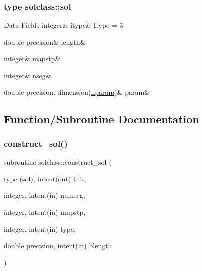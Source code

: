 \subsubsection{type solclass\+::sol}
\begin{DoxyFields}{Data Fields}
\mbox{\label{namespacesolclass_ae34e01b972a2658f3ff55fccc3f6b99a}} 
integer&
itype&
Itype = 3. \\
\hline

\mbox{\label{namespacesolclass_a66fe4253293f305d51d6d7db753bb2c2}} 
double precision&
length&
\\
\hline

\mbox{\label{namespacesolclass_a3821a5713cb3e0e9ae5359b42644b860}} 
integer&
mapstp&
\\
\hline

\mbox{\label{namespacesolclass_a4e0b71eae9d2072fd83b1a4e524da7fc}} 
integer&
nseg&
\\
\hline

\mbox{\label{namespacesolclass_a70efaac352dbf744000a92effd3d814b}} 
double precision, dimension(\mbox{\hyperlink{namespacesolclass_abb5af39a08a5ff2cbe713621b2727eaf}{nparam}})&
param&
\\
\hline

\end{DoxyFields}


\subsection{Function/\+Subroutine Documentation}
\mbox{\label{namespacesolclass_a2307b36cefac8604240e62757dd08cb9}} 
\subsubsection{\texorpdfstring{construct\_sol()}{construct\_sol()}}
{\footnotesize\ttfamily subroutine solclass\+::construct\+\_\+sol (\begin{DoxyParamCaption}\item[{type (\mbox{\hyperlink{namespacesolclass_structsolclass_1_1sol}{sol}}), intent(out)}]{this,  }\item[{integer, intent(in)}]{numseg,  }\item[{integer, intent(in)}]{nmpstp,  }\item[{integer, intent(in)}]{type,  }\item[{double precision, intent(in)}]{blength }\end{DoxyParamCaption})}

